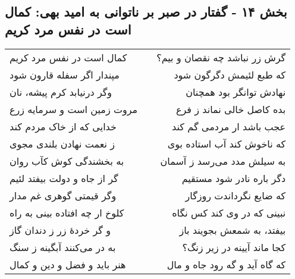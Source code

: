 \begin{center}
\section*{بخش ۱۴ - گفتار در صبر بر ناتوانی به امید بهی: کمال است در نفس مرد کریم}
\label{sec:014}
\begin{longtable}{l p{0.5cm} r}
کمال است در نفس مرد کریم
&&
گرش زر نباشد چه نقصان و بیم؟
\\
مپندار اگر سفله قارون شود
&&
که طبع لئیمش دگرگون شود
\\
وگر درنیابد کرم پیشه، نان
&&
نهادش توانگر بود همچنان
\\
مروت زمین است و سرمایه زرع
&&
بده کاصل خالی نماند ز فرع
\\
خدایی که از خاک مردم کند
&&
عجب باشد ار مردمی گم کند
\\
ز نعمت نهادن بلندی مجوی
&&
که ناخوش کند آب استاده بوی
\\
به بخشندگی کوش کآب روان
&&
به سیلش مدد می‌رسد ز آسمان
\\
گر از جاه و دولت بیفتد لئیم
&&
دگر باره نادر شود مستقیم
\\
وگر قیمتی گوهری غم مدار
&&
که ضایع نگرداندت روزگار
\\
کلوخ ار چه افتاده بینی به راه
&&
نبینی که در وی کند کس نگاه
\\
و گر خردهٔ زر ز دندان گاز
&&
بیفتد، به شمعش بجویند باز
\\
به در می‌کنند آبگینه ز سنگ
&&
کجا ماند آیینه در زیر زنگ؟
\\
هنر باید و فضل و دین و کمال
&&
که گاه آید و گه رود جاه و مال
\\
\end{longtable}
\end{center}
